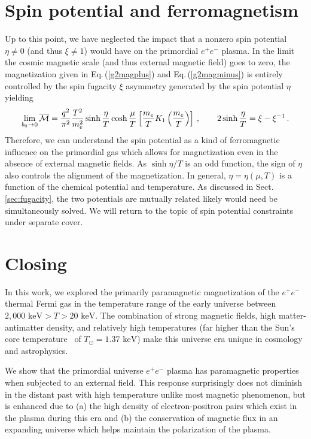 \documentclass[a4paper]{article}
\newcommand*{\keV}{\text{ keV}}
\newcommand{\req}[1]{Eq.\,(\ref{#1})}
\newcommand{\rsec}[1]{Sect.\,{\ref{#1}}}
\begin{document}
\section{Spin potential and ferromagnetism}
\label{sec:spin}
\noindent Up to this point, we have neglected the impact that a nonzero spin potential $\eta\neq0$ (and thus $\xi\neq1$) would have on the primordial $e^{+}e^{-}$ plasma. In the limit the cosmic magnetic scale (and thus external magnetic field) goes to zero, the magnetization given in \req{g2magplus} and \req{g2magminus} is entirely controlled by the spin fugacity $\xi$ asymmetry generated by the spin potential $\eta$ yielding
\begin{align}
    \lim_{b_{0}\rightarrow0}{\overline{\cal M}}=\frac{q^{2}}{\pi^{2}}\frac{T^{2}}{m_{e}^{2}}\sinh{\frac{\eta}{T}}\cosh{\frac{\mu}{T}}\left[\frac{m_{e}}{T}K_{1}\left(\frac{m_{e}}{T}\right)\right]\,,\qquad2\sinh{\frac{\eta}{T}}=\xi-\xi^{-1}\,.
\end{align}
Therefore, we can understand the spin potential as a kind of ferromagnetic influence on the primordial gas which allows for magnetization even in the absence of external magnetic fields. As $\sinh{\eta/T}$ is an odd function, the sign of $\eta$ also controls the alignment of the magnetization. In general, $\eta=\eta(\mu,T)$ is a function of the chemical potential and temperature. As discussed in \rsec{sec:fugacity}, the two potentials are mutually related likely would need be simultaneously solved. We will return to the topic of spin potential constraints under separate cover.

\section{Closing}
\label{sec:conclusions}
\noindent In this work, we explored the primarily paramagnetic magnetization of the $e^{+}e^{-}$ thermal Fermi gas in the temperature range of the early universe between $2,000\keV>T>20\keV$. The combination of strong magnetic fields, high matter-antimatter density, and relatively high temperatures (far higher than the Sun's core temperature~\cite{bahcall2001solar} of $T_{\odot}=1.37\keV$) make this universe era unique in cosmology and astrophysics.

We show that the primordial universe $e^{+}e^{-}$ plasma has paramagnetic properties when subjected to an external field. This response surprisingly does not diminish in the distant past with high temperature unlike most magnetic phenomenon, but is enhanced due to (a) the high density of electron-positron pairs which exist in the plasma during this era and (b) the conservation of magnetic flux in an expanding universe which helps maintain the polarization of the plasma.
\end{document}
